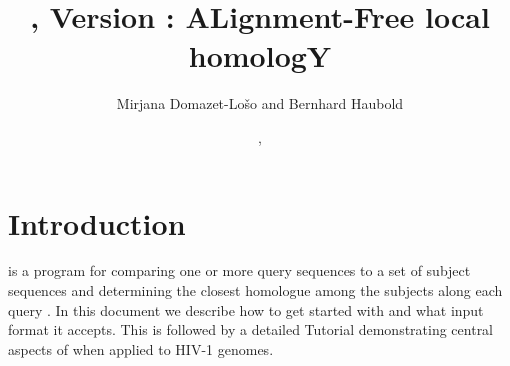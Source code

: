 \documentclass{article}
\begin{document}
\title{, Version \version: ALignment-Free local homologY}
\author{Mirjana Domazet-Lo\v{s}o and Bernhard Haubold}
\date{\!\!, }
\maketitle

\section{Introduction}
 is a program for comparing one or more query sequences to a
set of subject sequences and determining the closest homologue among
the subjects along each query \cite{dom11:ali}. In this document we 
describe how to get started with  and what input format it
accepts. This is followed by a detailed Tutorial demonstrating central
aspects of  when applied to HIV-1 genomes. 
\end{document}

